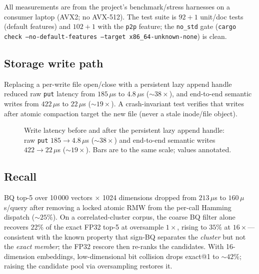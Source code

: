 \documentclass[11pt,twocolumn]{article}
\begin{document}
All measurements are from the project's benchmark/stress harnesses on a
consumer laptop (AVX2; no AVX-512). The test suite is $92{+}1$ unit/doc tests
(default features) and $102{+}1$ with the \texttt{p2p} feature; the
\texttt{no\_std} gate
(\texttt{cargo check --no-default-features --target x86\_64-unknown-none})
is clean.

\subsection{Storage write path}
\label{sec:eval-storage}

Replacing a per-write file open/close with a persistent lazy append handle
reduced raw \texttt{put} latency from $185\,\mu$s to $4.8\,\mu$s
($\sim 38\times$), and end-to-end semantic writes from $422\,\mu$s to
$22\,\mu$s ($\sim 19\times$). A crash-invariant test verifies that writes after
atomic compaction target the new file (never a stale inode/file object).

\begin{figure}[t]
\centering
{}
\caption{Write latency before and after the persistent lazy append handle:
raw \texttt{put} $185\to4.8\,\mu$s ($\sim 38\times$) and end-to-end semantic
writes $422\to22\,\mu$s ($\sim 19\times$). Bars are to the same scale; values
annotated.}
\label{fig:writes}
\end{figure}

\subsection{Recall}
\label{sec:eval-recall}

BQ top-5 over 10\,000 vectors $\times$ 1024 dimensions dropped from
$213\,\mu$s to $160\,\mu$s/query after removing a locked atomic RMW from the
per-call Hamming dispatch ($\sim 25\%$). On a correlated-cluster corpus, the
coarse BQ filter alone recovers $22\%$ of the exact FP32 top-5 at
oversample $1\times$, rising to $35\%$ at $16\times$---consistent with the
known property that sign-BQ separates the \emph{cluster} but not the
\emph{exact member}; the FP32 rescore then re-ranks the candidates. With
16-dimension embeddings, low-dimensional bit collision drops exact@1 to
$\sim 42\%$; raising the candidate pool via oversampling restores it.
\end{document}
